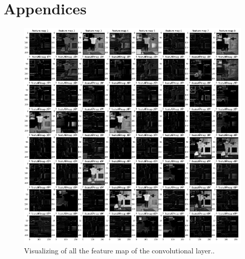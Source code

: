 \section{Appendices}


	

	
	
\begin{figure}[ht]
\centering
\includegraphics[angle=90,origin=c,width=1\columnwidth]{Figures/convnetFeatureMap.PNG}
\decoRule
\caption[Visualizing of all the feature map of the convolutional layer.]{ Visualizing of all the feature map of the convolutional layer..}
\label{fig:accuracycomparison2}
\end{figure}



